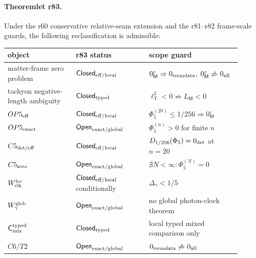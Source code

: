 \paragraph{Theoremlet r83.}
Under the r60 conservative relative-seam extension and the r81--r82 frame-scale guards,
the following reclassification is admissible:
\begin{center}
\begin{tabular}{@{}>{\raggedright\arraybackslash}p{0.29\linewidth}>{\raggedright\arraybackslash}p{0.3\linewidth}>{\raggedright\arraybackslash}p{0.32\linewidth}@{}}
object & r83 status & scope guard\\
\hline
matter-frame zero problem & \(\mathsf{Closed}_{\rm eff/local}\) & \(0_{\mathsf M}^{\varepsilon}\Rightarrow0_{\rm termdata},\;0_{\mathsf M}^{\varepsilon}\not\Rightarrow0_{\rm all}\)\\
tachyon negative-length ambiguity & \(\mathsf{Closed}_{\rm typed}\) & \(\ell_{\mathsf T}^{2}<0\not\Rightarrow L_{\mathsf M}<0\)\\
\(OP5_{\rm eff}\) & \(\mathsf{Closed}_{\rm eff/local}\) & \(\Phi_5^{(20)}\le 1/256\Rightarrow0_{\mathsf M}^{\varepsilon}\)\\
\(OP5_{\rm exact}\) & \(\mathsf{Open}_{\rm exact/global}\) & \(\Phi_5^{(n)}>0\)  for finite  \(n\)\\
\(C5_{\rm det/eff}\) & \(\mathsf{Closed}_{\rm eff/local}\) & \(D_{1/256}(\Phi_5)=0_{\rm det}\)  at  \(n=20\)\\
\(C5_{\rm zero}\) & \(\mathsf{Open}_{\rm exact/global}\) & \(\nexists N<\infty:\Phi_5^{(N)}=0\)\\
\(W_{\rm clk}^{\rm loc}\) & \(\mathsf{Closed}_{\rm eff/local}\)  conditionally & \(\Delta_{\gamma}<1/5\)\\
\(W_{\gamma}^{\rm glob}\) & \(\mathsf{Open}_{\rm exact/global}\) & no global photon-clock theorem\\
\(\mathsf C_{\rm mix}^{\rm typed}\) & \(\mathsf{Closed}_{\rm typed}\) & local typed mixed comparison only\\
\(C6/T2\) & \(\mathsf{Open}_{\rm exact/global}\) & \(0_{\rm termdata}\not\Rightarrow0_{\rm all}\)\\
\end{tabular}
\end{center}

